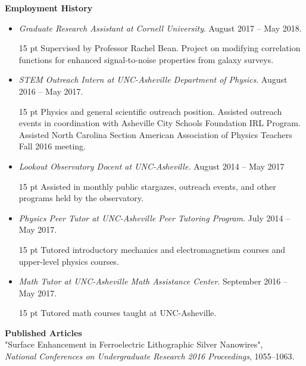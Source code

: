 \documentclass[a4paper, 11pt]{article}
\newcommand{\noi}{\noindent}
\newcommand{\ind}{\indent}
\newenvironment{pari}{\begin{adjustwidth}{15 pt}{}}{\end{adjustwidth}}
\begin{document}
\noi \textbf{Employment History}
\begin{itemize}[leftmargin=*]
	\item \noi \emph{Graduate Research Assistant at Cornell University}. August 2017 -- May 2018.
	\begin{pari}
		Supervised by Professor Rachel Bean. Project on modifying correlation functions for enhanced signal-to-noise properties from galaxy surveys.
	\end{pari}

	\item \noi \emph{STEM Outreach Intern at UNC-Asheville Department of Physics}. August 2016 -- May 2017.
	\begin{pari}
		Physics and general scientific outreach position. Assisted outreach events in coordination with Asheville City Schools Foundation IRL Program. Assisted North Carolina Section American Association of Physics Teachers Fall 2016 meeting.
	\end{pari}

	\item \noi \emph{Lookout Observatory Docent at UNC-Asheville.} August 2014 -- May 2017
		\begin{pari}
			\noi Assisted in monthly public stargazes, outreach events, and other programs held by the observatory.
		\end{pari}

	\item \noi \emph{Physics Peer Tutor at UNC-Asheville Peer Tutoring Program}. July 2014 -- May 2017.
	\begin{pari}
	\noi Tutored introductory mechanics and electromagnetism courses and upper-level physics courses.
	\end{pari}

	\item \noi \emph{Math Tutor at UNC-Asheville Math Assistance Center}.  September 2016 -- May 2017.
	\begin{pari}
		\noi Tutored math courses taught at UNC-Asheville. 
	\end{pari}
\end{itemize}

\newpage

\noi \textbf{Published Articles}
\\

\noi "Surface Enhancement in Ferroelectric Lithographic Silver Nanowires", 
\\
	\ind \emph{National Conferences on Undergraduate Research 2016 Proceedings}, 1055--1063.
\\
\end{document}
